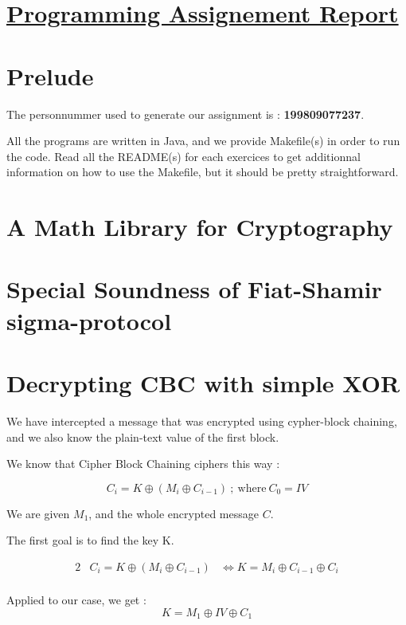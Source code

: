 \documentclass[12pt]{article}
\newcommand*\xor{\oplus}
\begin{document}
\section* {\underline{Programming Assignement Report}}

\section*{Prelude}

The personnummer used to generate our assignment is : \textbf{{\large 199809077237}}.

All the programs are written in Java, and we provide Makefile(s) in order to run the code. Read all the README(s) for each exercices to get additionnal information on how to use the Makefile, but it should be pretty straightforward.

\section{A Math Library for Cryptography}

\newpage
\section{Special Soundness of Fiat-Shamir sigma-protocol}

\newpage
\section{Decrypting CBC with simple XOR}

We have intercepted a message that was encrypted using cypher-block chaining, and we also know the plain-text value of the first block.

We know that Cipher Block Chaining ciphers this way :

$$
    C_i = K \xor (M_i \xor C_{i-1})\ ;\ \textrm{where}\ C_0 = IV
$$

We are given $M_1$, and the whole encrypted message $C$.

The first goal is to find the key K.

\vspace{-2em}
\begin{alignat*}{2}
    &C_i = K \xor (M_i \xor C_{i-1})&\iff K = M_i \xor C_{i-1} \xor C_i\\
\end{alignat*}
\vspace{-2em}

Applied to our case, we get :
$$
    K = M_1 \xor IV \xor C_1
$$
\end{document}
